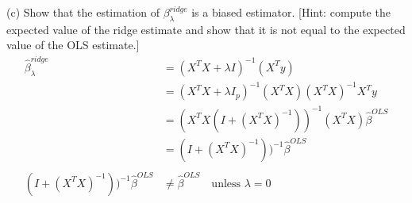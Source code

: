 \documentclass[draft]{exam} %
\theoremstyle{definition} \newtheorem*{defn}{Definition}
\begin{document}
\begin{questions}
\begin{solution}
(c) Show that the estimation of $\beta^{ridge}_\lambda$ is a biased estimator. [Hint: compute the expected value of the ridge estimate and show that it is not equal to the expected value of the OLS estimate.]
\begin{align*}
\hat{\beta}_{\lambda}^{ridge} & = ( X^T X + \lambda I )^{-1} ( X^T y ) \\
& = ( X^T X + \lambda I_p )^{-1} ( X^T X ) ( X^T X )^{-1} X^T y \\
& = ( X^T X ( I + ( X^T X )^{-1} ) )^{-1} ( X^T X ) \hat{\beta}^{OLS} \\
& = ( I + ( X^T X )^{-1} ) )^{-1} \hat{\beta}^{OLS} \\\\
( I + ( X^T X )^{-1} ) )^{-1} \hat{\beta}^{OLS} & \neq \hat{\beta}^{OLS} \quad \text{unless } \lambda = 0
\end{align*}

\end{solution}

\end{questions} 
\end{document}
